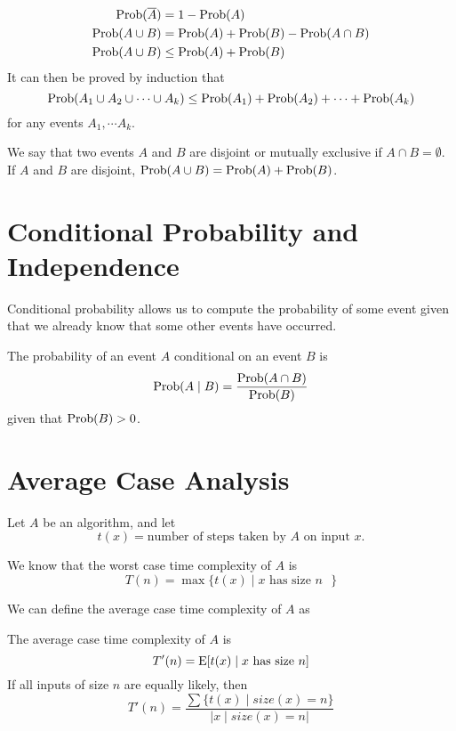 \begin{theorem}
    $$
    \begin{aligned}
        \mathrm{Prob}(\overline{A}) &= 1 - \mathrm{Prob}(A) \\
        \mathrm{Prob}(A \cup B) &= \mathrm{Prob}(A) + \mathrm{Prob}(B) - \mathrm{Prob}(A \cap B) \\
        \mathrm{Prob}(A \cup B) &\leq \mathrm{Prob}(A) + \mathrm{Prob}(B)
    \end{aligned}
    $$
    It can then be proved by induction that
    $$
    \mathrm{Prob}(A_1 \cup A_2 \cup \cdots \cup A_k) \leq \mathrm{Prob}(A_1) + \mathrm{Prob}(A_2) + \cdots + \mathrm{Prob}(A_k)
    $$
    for any events $A_1, \cdots A_k$.
\end{theorem}

We say that two events $A$ and $B$ are disjoint or mutually exclusive if $A \cap B = \emptyset$. If $A$ and $B$ are disjoint, $\mathrm{Prob}(A \cup B) = \mathrm{Prob}(A) + \mathrm{Prob}(B)$.

\section{Conditional Probability and Independence}

Conditional probability allows us to compute the probability of some event given that we already know that some other events have occurred.

\begin{definition} 
    The probability of an event $A$ conditional on an event $B$ is
    $$
    \mathrm{Prob}(A \mid B) = \frac{\mathrm{Prob}(A \cap B)}{\mathrm{Prob}(B)}
    $$
    given that $\mathrm{Prob}(B) > 0$. 
\end{definition}

\section{Average Case Analysis}

Let $A$ be an algorithm, and let
\[
t(x) = \text{number of steps taken by $A$ on input $x$}
.\] 

We know that the worst case time complexity of $A$ is
$$
T(n) = \max \{ t(x) \mid \text{$x$ has size $n$ } \}
$$

We can define the average case time complexity of $A$ as

\begin{definition}
    The average case time complexity of $A$ is
    $$
    T'(n) = \mathrm{E} [ t(x) \mid \text{$x$ has size $n$} ]
    $$
    If all inputs of size $n$ are equally likely, then
    $$
    T'(n) = \frac{\sum \{ t(x) \mid size(x) = n \}}{| x \mid size(x) = n |}
    $$
\end{definition}

